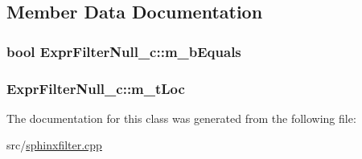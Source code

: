 \subsection{Member Data Documentation}
\hypertarget{classExprFilterNull__c_ab25c95a16fd5321a9b49168255dd18e5}{
\subsubsection[{m\-\_\-b\-Equals}]{\setlength{\rightskip}{0pt plus 5cm}bool Expr\-Filter\-Null\-\_\-c\-::m\-\_\-b\-Equals\hspace{0.3cm}{\ttfamily [protected]}}}\label{classExprFilterNull__c_ab25c95a16fd5321a9b49168255dd18e5}
\hypertarget{classExprFilterNull__c_aab49a47ba5710a473af1cf3a4d4abc9a}{
\subsubsection[{m\-\_\-t\-Loc}]{ Expr\-Filter\-Null\-\_\-c\-::m\-\_\-t\-Loc\hspace{0.3cm}{\ttfamily [protected]}}}\label{classExprFilterNull__c_aab49a47ba5710a473af1cf3a4d4abc9a}


The documentation for this class was generated from the following file\-:\begin{DoxyCompactItemize}
\item 
src/\hyperlink{sphinxfilter_8cpp}{sphinxfilter.\-cpp}\end{DoxyCompactItemize}
